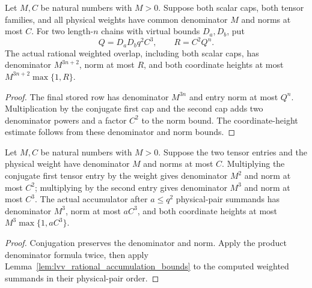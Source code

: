 \begin{lemma}
    \label{lem:lvv_capped_weighted_overlap_bounds}
    \leanok
    Let $M,C$ be natural numbers with $M>0$. Suppose both scalar caps,
    both tensor families, and all physical weights have common
    denominator $M$ and norms at most $C$. For two length-$n$ chains
    with virtual bounds $D_a,D_b$, put
    \[
        Q=D_aD_bq^2C^3,\qquad R=C^2Q^n.
    \]
    The actual rational weighted overlap, including both scalar caps,
    has denominator $M^{3n+2}$, norm at most $R$, and both coordinate
    heights at most $M^{3n+2}\max\{1,R\}$.
\end{lemma}
\begin{proof}\leanok
    The final stored row has denominator $M^{3n}$ and entry norm
    at most $Q^n$. Multiplication by the conjugate first cap and the
    second cap adds two denominator powers and a factor $C^2$ to the
    norm bound. The coordinate-height estimate follows from these
    denominator and norm bounds.
\end{proof}

\begin{lemma}
    \label{lem:lvv_weighted_transfer_entry_partial_sums}
    \leanok
    Let $M,C$ be natural numbers with $M>0$. Suppose the two tensor
    entries and the physical weight have denominator $M$ and norms
    at most $C$. Multiplying the conjugate first tensor entry by the
    weight gives denominator $M^2$ and norm at most $C^2$; multiplying
    by the second entry gives denominator $M^3$ and norm at most $C^3$.
    The actual accumulator after $a\le q^2$ physical-pair summands
    has denominator $M^3$, norm at most $aC^3$, and both coordinate
    heights at most $M^3\max\{1,aC^3\}$.
\end{lemma}
\begin{proof}\leanok
    Conjugation preserves the denominator and norm. Apply the product
    denominator formula twice, then apply
    Lemma~\ref{lem:lvv_rational_accumulation_bounds} to the computed
    weighted summands in their physical-pair order.
\end{proof}

